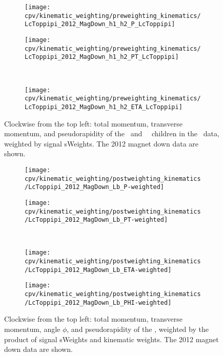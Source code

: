 \begin{figure}
  \begin{subfigure}[b]{0.5\textwidth}
    \centering
    \texttt{[image: cpv/kinematic\_weighting/preweighting\_kinematics/LcToppipi\_2012\_MagDown\_h1\_h2\_P\_LcToppipi]}
    \label{fig:cpv:kinematic_weighting:pre:ppipi_h1h2:P}
  \end{subfigure}
  \begin{subfigure}[b]{0.5\textwidth}
    \centering
    \texttt{[image: cpv/kinematic\_weighting/preweighting\_kinematics/LcToppipi\_2012\_MagDown\_h1\_h2\_PT\_LcToppipi]}
    \label{fig:cpv:kinematic_weighting:pre:ppipi_h1h2:PT}
  \end{subfigure}\\
  \begin{subfigure}[b]{\textwidth}
    \centering
    \texttt{[image: cpv/kinematic\_weighting/preweighting\_kinematics/LcToppipi\_2012\_MagDown\_h1\_h2\_ETA\_LcToppipi]}
    \label{fig:cpv:kinematic_weighting:pre:ppipi_h1h2:ETA}
  \end{subfigure}
  \caption{%
    Clockwise from the top left: total momentum, transverse momentum, and
    pseudorapidity of the \Ppiminus\ and \Ppiplus\ \PLambdac\ children in the
    \ppipi\ data, weighted by signal sWeights.
    The 2012 magnet down data are shown.
  }
  \label{fig:cpv:kinematic_weighting:pre:ppipi_h1h2}
\end{figure}

\begin{figure}
  \begin{subfigure}[b]{0.4\textwidth}
    \texttt{[image: cpv/kinematic\_weighting/postweighting\_kinematics/LcToppipi\_2012\_MagDown\_Lb\_P-weighted]}
    \label{fig:cpv:kinematic_weighting:post:Lb:P}
  \end{subfigure}
  \begin{subfigure}[b]{0.4\textwidth}
    \texttt{[image: cpv/kinematic\_weighting/postweighting\_kinematics/LcToppipi\_2012\_MagDown\_Lb\_PT-weighted]}
    \label{fig:cpv:kinematic_weighting:post:Lb:PT}
  \end{subfigure}\\
  \begin{subfigure}[b]{0.4\textwidth}
    \texttt{[image: cpv/kinematic\_weighting/postweighting\_kinematics/LcToppipi\_2012\_MagDown\_Lb\_ETA-weighted]}
    \label{fig:cpv:kinematic_weighting:post:Lb:ETA}
  \end{subfigure}
  \begin{subfigure}[b]{0.4\textwidth}
    \texttt{[image: cpv/kinematic\_weighting/postweighting\_kinematics/LcToppipi\_2012\_MagDown\_Lb\_PHI-weighted]}
    \label{fig:cpv:kinematic_weighting:post:Lb:PHI}
  \end{subfigure}
  \caption{%
    Clockwise from the top left: total momentum, transverse momentum, angle
    $\phi$, and pseudorapidity of the \PLambdab, weighted by the product of
    signal sWeights and kinematic weights.
    The 2012 magnet down data are shown.
  }
  \label{fig:cpv:kinematic_weighting:post:Lb}
\end{figure}

